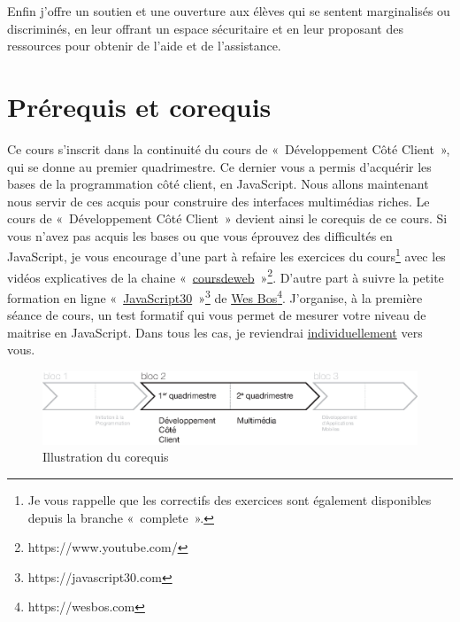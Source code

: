 Enfin j'offre un soutien et une ouverture aux élèves qui se sentent marginalisés ou discriminés, en leur offrant un espace sécuritaire et en leur proposant des ressources pour obtenir de l'aide et de l'assistance.

\clearpage
\section{Prérequis et corequis}
Ce cours s’inscrit dans la continuité du cours de «~Développement Côté Client~», qui se donne au premier quadrimestre. Ce dernier vous a permis d’acquérir les bases de la programmation côté client, en JavaScript. Nous allons maintenant nous servir de ces acquis pour construire des interfaces multimédias riches. Le cours de «~Développement Côté Client~» devient ainsi le corequis de ce cours.
Si vous n’avez pas acquis les bases ou que vous éprouvez des difficultés en JavaScript, je vous encourage d’une part à refaire les exercices du cours\footnote{Je vous rappelle que les correctifs des exercices sont également disponibles depuis la branche «~complete~».} avec les vidéos explicatives de la chaine «~\href{https://www.youtube.com/@coursdeweb}{coursdeweb}~»\footnote{https://www.youtube.com/\@coursdeweb}. D’autre part à suivre la petite formation en ligne «~\href{https://javascript30.com}{JavaScript30}~»\footnote{https://javascript30.com} de \href{https://wesbos.com}{Wes Bos}\footnote{https://wesbos.com}. J'organise, à la première séance de cours, un test formatif qui vous permet de mesurer votre niveau de maitrise en JavaScript. Dans tous les cas, je reviendrai \underline{individuellement} vers vous.

\begin{figure}[H]
    \begin{center}
        \includegraphics[width=\textwidth]{figures/corequis.eps}
        \caption{Illustration du corequis}
        \label{Fig:GQM}
    \end{center}
\end{figure}
\clearpage


